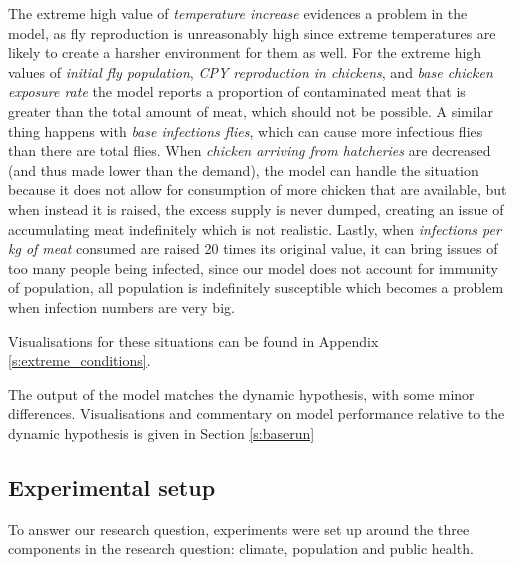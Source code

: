 The extreme high value of \textit{temperature increase} evidences a problem in the model, as fly reproduction is unreasonably high since extreme temperatures are likely to create a harsher environment for them as well. For the extreme high values of \textit{initial fly population}, \textit{CPY reproduction in chickens}, and \textit{base chicken exposure rate} the model reports a proportion of contaminated meat that is greater than the total amount of meat, which should not be possible. A similar thing happens with \textit{base infections flies}, which can cause more infectious flies than there are total flies. When \textit{chicken arriving from hatcheries} are decreased (and thus made lower than the demand), the model can handle the situation because it does not allow for consumption of more chicken that are available, but when instead it is raised, the excess supply is never dumped, creating an issue of accumulating meat indefinitely which is not realistic. Lastly, when \textit{infections per kg of meat} consumed are raised 20 times its original value, it can bring issues of too many people being infected, since our model does not account for immunity of population, all population is indefinitely susceptible which becomes a problem when infection numbers are very big.%

Visualisations for these situations can be found in Appendix \ref{s:extreme_conditions}.
    
The output of the model matches the dynamic hypothesis, with some minor differences. Visualisations and commentary on model performance relative to the dynamic hypothesis is given in Section \ref{s:baserun}
    
\subsection{Experimental setup}
  
To answer our research question, experiments were set up around the three components in the research question: climate, population and public health. 

